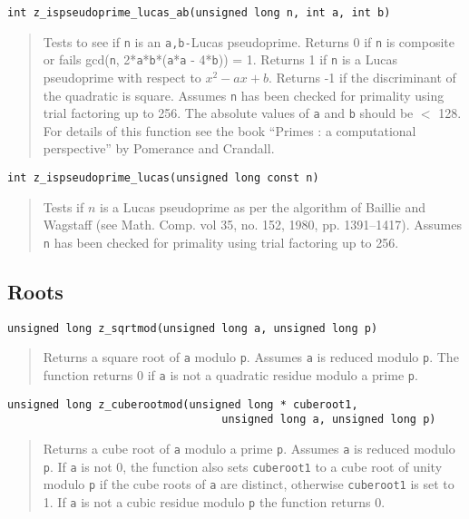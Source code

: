 \documentclass[a4paper,10pt]{article}
\newcommand{\code}{\lstinline}
\begin{document}
\begin{lstlisting}
int z_ispseudoprime_lucas_ab(unsigned long n, int a, int b)
\end{lstlisting}
\begin{quote}
Tests to see if \code{n} is an \code{a,b-}Lucas pseudoprime.  Returns 0 if \code{n} is composite or fails gcd(\code{n}, 2*\code{a}*\code{b}*(\code{a}*\code{a} - 4*\code{b})) = 1.  Returns 1 if \code{n} is a Lucas pseudoprime with respect to $x^2 - ax + b$.  Returns -1 if the discriminant of the quadratic is square.  Assumes \code{n} has been checked for primality using trial factoring up to 256.  The absolute values of \code{a} and \code{b} should be $<$ 128. For details of this function see the book ``Primes : a computational perspective'' by Pomerance and Crandall.
\end{quote}

\begin{lstlisting}
int z_ispseudoprime_lucas(unsigned long const n)
\end{lstlisting}
\begin{quote}
Tests if $n$ is a Lucas pseudoprime as per the algorithm of Baillie and Wagstaff (see Math. Comp. vol 35, no. 152, 1980, pp. 1391--1417).  Assumes \code{n} has been checked for primality using trial factoring up to 256. 
\end{quote}

\subsection{Roots}

\begin{lstlisting}
unsigned long z_sqrtmod(unsigned long a, unsigned long p)
\end{lstlisting}
\begin{quote}
Returns a square root of \code{a} modulo \code{p}. Assumes \code{a} is reduced modulo \code{p}. The function returns 0 if \code{a} is not a quadratic residue modulo a prime \code{p}.
\end{quote}

\begin{lstlisting}
unsigned long z_cuberootmod(unsigned long * cuberoot1, 
                                 unsigned long a, unsigned long p)
\end{lstlisting}
\begin{quote}
Returns a cube root of \code{a} modulo a prime \code{p}. Assumes \code{a} is reduced modulo \code{p}. If \code{a} is not 0, the function also sets \code{cuberoot1} to a cube root of unity modulo \code{p} if the cube roots of \code{a} are distinct, otherwise \code{cuberoot1} is set to 1. If \code{a} is not a cubic residue modulo \code{p} the function returns 0.
\end{quote}
\end{document}
